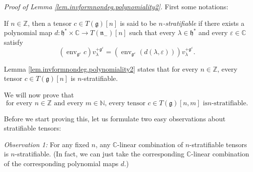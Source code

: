 \documentclass
[numbers=enddot,12pt,final,onecolumn,german,notitlepage]{scrartcl}%
\theoremstyle{definition}
\begin{document}
\textit{Proof of Lemma \ref{lem.invformnondeg.polynomiality2}.} First some notations:

If $n\in\mathbb{Z}$, then a tensor $c\in T\left(  \mathfrak{g}\right)  \left[
n\right]  $ is said to be $n$\textit{-stratifiable} if there exists a
polynomial map $d:\mathfrak{h}^{\ast}\times\mathbb{C}\rightarrow T\left(
\mathfrak{n}_{-}\right)  \left[  n\right]  $ such that every $\lambda
\in\mathfrak{h}^{\ast}$ and every $\varepsilon\in\mathbb{C}$ satisfy%
\[
\left(  \operatorname*{env}\nolimits_{\mathfrak{g}^{\varepsilon}}c\right)
v_{\lambda}^{+\mathfrak{g}^{\varepsilon}}=\left(  \operatorname*{env}%
\nolimits_{\mathfrak{g}^{\varepsilon}}\left(  d\left(  \lambda,\varepsilon
\right)  \right)  \right)  v_{\lambda}^{+\mathfrak{g}^{\varepsilon}}.
\]


Lemma \ref{lem.invformnondeg.polynomiality2} states that for every
$n\in\mathbb{Z}$, every tensor $c\in T\left(  \mathfrak{g}\right)  \left[
n\right]  $ is $n$-stratifiable.

We will now prove that
\begin{equation}
\text{for every }n\in\mathbb{Z}\text{ and every }m\in\mathbb{N}\text{, every
tensor }c\in T\left(  \mathfrak{g}\right)  \left[  n,m\right]  \text{ is
}n\text{-stratifiable.} \label{lem.invformnondeg.polynomiality2.ind}%
\end{equation}


Before we start proving this, let us formulate two easy observations about
stratifiable tensors:

\textit{Observation 1:} For any fixed $n$, any $\mathbb{C}$-linear combination
of $n$-stratifiable tensors is $n$-stratifiable. (In fact, we can just take
the corresponding $\mathbb{C}$-linear combination of the corresponding
polynomial maps $d$.)
\end{document}
